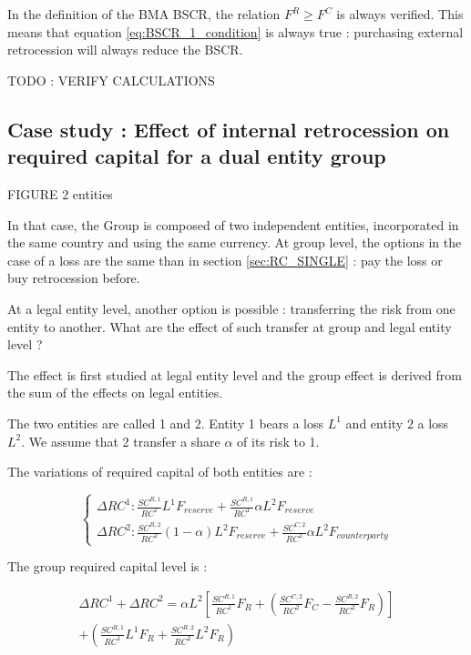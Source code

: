 In the definition of the BMA BSCR, the relation $F^R \geq F^C$ is always verified. This means that equation \ref{eq:BSCR_1_condition} is always true : purchasing external retrocession will always reduce the BSCR.


TODO : VERIFY CALCULATIONS


\subsection{Case study : Effect of internal retrocession on required capital for a dual entity group}
\label{sec:RC_DOUBLE}

FIGURE 2 entities

In that case, the Group is composed of two independent entities, incorporated in the same country and using the same currency. At group level, the options in the case of a loss are the same than in section \ref{sec:RC_SINGLE} : pay the loss or buy retrocession before.

At a legal entity level, another option is possible : transferring the risk from one entity to another.
What are the effect of such transfer at group and legal entity level ?

The effect is first studied at legal entity level and the group effect is derived from the sum of the effects on legal entities.

The two entities are called 1 and 2. Entity 1 bears a loss $L^1$ and entity 2 a loss $L^2$. We assume that 2 transfer a share $\alpha$ of its risk to 1. 

The variations of required capital of both entities are :

$$
\left\{
    \begin{array}{ll}
        \Delta RC^1 : \frac{SC^{R,1}}{RC^1} L^1 F_{reserve} + \frac{SC^{R,1}}{RC^1} \alpha L^2 F_{reserve}  \\
        \Delta RC^2 : \frac{SC^{R,2}}{RC^2}(1-\alpha)L^2 F_{reserve} + \frac{SC^{C,2}}{RC^2}\alpha L^2 F_{counterparty} 
    \end{array}
\right.
$$

The group required capital level is :

\begin{multline}
	\Delta RC^1 + \Delta RC^2 = \alpha L^2 \left[ \frac{SC^{R,1}}{RC^1} F_{R} + \left(\frac{SC^{C,2}}{RC^2} F_{C} - \frac{SC^{R,2}}{RC^2} F_{R} \right) \right] \\+  \left( \frac{SC^{R,1}}{RC^1} L^1 F_{R} + \frac{SC^{R,2}}{RC^2} L^2 F_{R} \right)
\end{multline}

